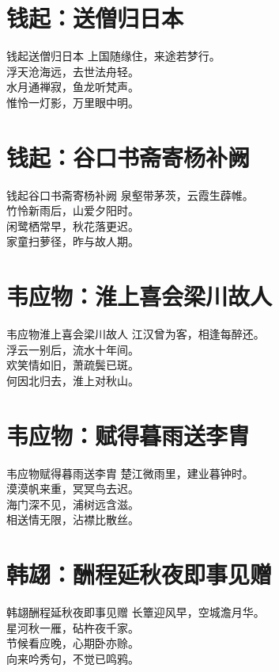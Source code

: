 \documentclass[12pt,oneside,a5paper]{book}
\begin{document}
\chapter{钱起：送僧归日本}
\begin{poemzh}{钱起}{送僧归日本}
上国随缘住，来途若梦行。\\
浮天沧海远，去世法舟轻。\\
水月通禅寂，鱼龙听梵声。\\
惟怜一灯影，万里眼中明。\\ 
\end{poemzh}

\chapter{钱起：谷口书斋寄杨补阙}
\begin{poemzh}{钱起}{谷口书斋寄杨补阙}
泉壑带茅茨，云霞生薜帷。\\
竹怜新雨后，山爱夕阳时。\\
闲鹭栖常早，秋花落更迟。\\
家童扫萝径，昨与故人期。\\ 
\end{poemzh}

\chapter{韦应物：淮上喜会梁川故人}
\begin{poemzh}{韦应物}{淮上喜会梁川故人}
江汉曾为客，相逢每醉还。\\
浮云一别后，流水十年间。\\
欢笑情如旧，萧疏鬓已斑。\\
何因北归去，淮上对秋山。\\ 
\end{poemzh}

\chapter{韦应物：赋得暮雨送李胄}
\begin{poemzh}{韦应物}{赋得暮雨送李胄}
楚江微雨里，建业暮钟时。\\
漠漠帆来重，冥冥鸟去迟。\\
海门深不见，浦树远含滋。\\
相送情无限，沾襟比散丝。\\ 
\end{poemzh}

\chapter{韩翃：酬程延秋夜即事见赠}
\begin{poemzh}{韩翃}{酬程延秋夜即事见赠}
长簟迎风早，空城澹月华。\\
星河秋一雁，砧杵夜千家。\\
节候看应晚，心期卧亦赊。\\
向来吟秀句，不觉已鸣鸦。\\ 
\end{poemzh}
\end{document}
